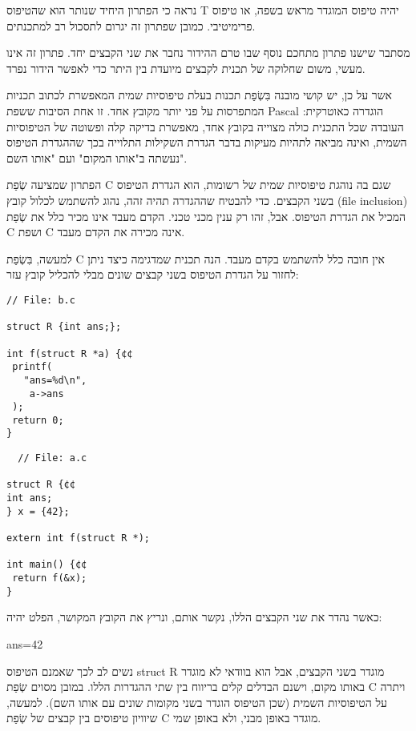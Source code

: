       נראה כי הפתרון היחיד שנותר הוא שהטיפוס T יהיה טיפוס המוגדר מראש בשפה, או טיפוס פרימיטיבי. כמובן שפתרון זה יגרום לתסכול רב למתכנתים.

      מסתבר שישנו פתרון מתחכם נוסף שבו טרם ההידור נחבר את שני הקבצים יחד. פתרון זה אינו מעשי, משום שחלוקה של תכנית לקבצים מיועדת בין היתר כדי לאפשר הידור נפרד.

      אשר על כן, יש קושי מובנה בִּשְׂפַת תכנות בעלת טיפוסיות שמית המאפשרת לכתוב תכניות
      המתפרסות על פני יותר מקובץ אחד. זו אחת הסיבות ששפת Pascal הוגדרה כאוטרקית:
      העובדה שכל התכנית כולה מצוייה בקובץ אחד, מאפשרת בדיקה קלה ופשוטה של הטיפוסיות
      השמית, ואינה מביאה לתהיות מעיקות בדבר הגדרת השקילות התלוייה בכך שההגדרת הטיפוס
      נעשתה ב"אותו המקום" ועם "אותו השם".

      הפתרון שמציעה שְׂפַת C שגם בה נוהגת טיפוסיות שמית של רשומות, הוא הגדרת הטיפוס בשני
      הקבצים. כדי להבטיח שההגדרה תהיה זהה, נהוג להשתמש לכלול קובץ (file inclusion)
      המכיל את הגדרת הטיפוס. אבל, זהו רק ענין מכני טכני. הקדם מעבד אינו מכיר כלל את
      שְׂפַת C ושפת C אינה מכירה את הקדם מעבד.

      למעשה, בִּשְׂפַת C אין חובה כלל להשתמש בקדם מעבד. הנה תכנית שמדגימה כיצד ניתן לחזור
      על הגדרת הטיפוס בשני קבצים שונים מבלי להכליל קובץ עזר:

\begin{verbatim}
// File: b.c

struct R {int ans;};

int f(struct R *a) {¢¢
 printf(
   "ans=%d\n",
    a->ans
 );
 return 0;
}

\end{verbatim}

\begin{verbatim}
  // File: a.c

struct R {¢¢
int ans;
} x = {42};

extern int f(struct R *);

int main() {¢¢
 return f(&x);
}
\end{verbatim}

      כאשר נהדר את שני הקבצים הללו, נקשר אותם, ונריץ את הקובץ המקושר, הפלט יהיה:

      ans=42

      נשים לב לכך שאמנם הטיפוס struct R מוגדר בשני הקבצים, אבל הוא בוודאי לא מוגדר באותו מקום, וישנם הבדלים קלים בריווח בין שתי ההגדרות הללו. במובן מסוים שְׂפַת C ויתרה על הטיפוסיות השמית (שכן הטיפוס הוגדר בשני מקומות שונים עם אותו השם). למעשה, שיוויון טיפוסים בין קבצים של שְׂפַת C מוגדר באופן מבני, ולא באופן שמי.

